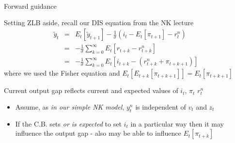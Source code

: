 \begin{frame}{Forward guidance}

Setting ZLB aside, recall our DIS equation from the NK lecture
\begin{eqnarray*}
\tilde{y}_{t} &=& E_{t} \left[ \tilde{y}_{t+1} \right] - \frac{1}{\sigma} \left(i_{t} - E_{t}\left[ \pi_{t+1} \right]  - r^{n}_{t} \right) \label{eqn:dyn_IS} \\
&=& -\frac{1}{\sigma} \sum\limits_{k=0}^{\infty} E_{t}[ r_{t+k}  - r^{n}_{t+k} ] \nonumber \\
&=& -\frac{1}{\sigma} \sum\limits_{k=0}^{\infty} E_{t}[ i_{t+k} -  (r^{n}_{t+k} + \pi_{t+k+1}) ] \nonumber
\end{eqnarray*}
where we used the Fisher equation and $E_{t}[E_{t+k}[\pi_{t+k+1}]]= E_{t}[\pi_{t+k+1}]$

\vspace{2mm}
Current output gap reflects current and expected values of $i_{t}$, $\pi_{t}$ $r^{n}_{t}$
\begin{itemize}
\item	Assume, as \textit{in our simple NK model}, $y^{n}_{t}$ is independent of $v_{t}$ and $z_{t}$
\item	If the C.B. sets \textit{or is expected} to set $i_{t}$ in a particular way then it may influence the output gap - also may be able to influence $E_{t}[\pi_{t+k}]$
\end{itemize}

\end{frame}


	

